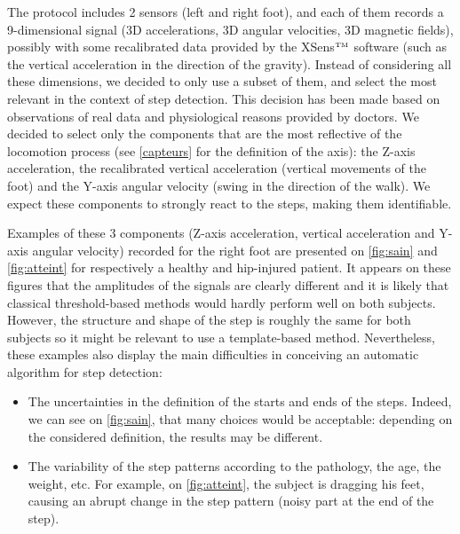 \documentclass[../thesis.tex]{subfiles}
\begin{document}
The protocol includes 2 sensors (left and right foot), and each of them records a 9-dimensional signal (3D accelerations, 3D angular velocities, 3D magnetic fields), possibly with some recalibrated data provided by the XSens$^{\mbox{\tiny TM}}$ software (such as the vertical acceleration in the direction of the gravity). Instead of considering all these dimensions, we decided to only use a subset of them, and select the most relevant in the context of step detection. This decision has been made based on observations of real data and physiological reasons provided by doctors. We decided to select only the components that are the most reflective of the locomotion process (see \autoref{capteurs} for the definition of the axis): the Z-axis acceleration, the recalibrated vertical acceleration (vertical movements of the foot) and the Y-axis angular velocity (swing in the direction of the walk). We expect these components to strongly react to the steps, making them identifiable.



Examples of these 3 components (Z-axis acceleration, vertical acceleration and Y-axis angular velocity) recorded for the right foot are presented on \autoref{fig:sain} and \autoref{fig:atteint} for respectively a healthy and hip-injured patient. It appears on these figures that the amplitudes of the signals are clearly different and it is likely that classical threshold-based methods would hardly perform well on both subjects. However, the structure and shape of the step is roughly the same for both subjects so it might be relevant to use a template-based method. Nevertheless, these examples also display the main difficulties in conceiving an automatic algorithm for step detection:
%
\begin{itemize}
    \item The uncertainties in the definition of the starts and ends of the
    steps. Indeed, we can see on \autoref{fig:sain}, that many choices would
    be acceptable: depending on the considered definition, the results may
    be different.
    \item The variability of the step patterns according to the pathology,
    the age, the weight, etc. For example, on \autoref{fig:atteint}, the
    subject is dragging his feet, causing an abrupt change in the step
    pattern (noisy part at the end of the step).
\end{itemize}



\biblio{}
\end{document}
